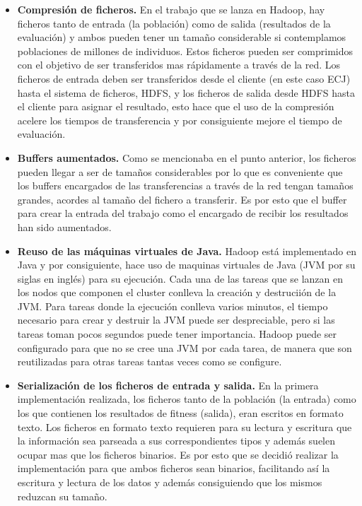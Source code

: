 \begin{itemize}
	\item \textbf{Compresi\'on de ficheros.} En el trabajo que se lanza en Hadoop, hay ficheros tanto de entrada (la población) como de salida (resultados de la evaluación) y ambos pueden tener un tamaño considerable si contemplamos poblaciones de millones de individuos. Estos ficheros pueden ser comprimidos con el objetivo de ser transferidos mas rápidamente a trav\'es de la red. Los ficheros de entrada deben ser transferidos desde el cliente (en este caso ECJ) hasta el sistema de ficheros, HDFS, y los ficheros de salida desde HDFS hasta el cliente para asignar el resultado, esto hace que el uso de la compresión acelere los tiempos de transferencia y por consiguiente mejore el tiempo de evaluación.
	\item \textbf{Buffers aumentados.} Como se mencionaba en el punto anterior, los ficheros pueden llegar a ser de tamaños considerables por lo que es conveniente que los buffers encargados de las transferencias a través de la red tengan tamaños grandes, acordes al tamaño del fichero a transferir. Es por esto que el buffer para crear la entrada del trabajo como el encargado de recibir los resultados han sido aumentados.
	\item \textbf{Reuso de las m\'aquinas virtuales de Java.} Hadoop est\'a implementado en Java y por consiguiente, hace uso de maquinas virtuales de Java (JVM por su siglas en ingl\'es) para su ejecuci\'on. Cada una de las tareas que se lanzan en los nodos que componen el cluster conlleva la creaci\'on y destrucii\'on de la JVM. Para tareas donde la ejecuci\'on conlleva varios minutos, el tiempo necesario para crear y destruir la JVM puede ser despreciable, pero si las tareas toman pocos segundos puede tener importancia. Hadoop puede ser configurado para que no se cree una JVM por cada tarea, de manera que son reutilizadas para otras tareas tantas veces como se configure.
	\item \textbf{Serializaci\'on de los ficheros de entrada y salida.} En la primera implementación realizada, los ficheros tanto de la población (la entrada) como los que contienen los resultados de fitness (salida), eran escritos en formato texto. Los ficheros en formato texto requieren para su lectura y escritura que la información sea parseada a sus correspondientes tipos y adem\'as suelen ocupar mas que los ficheros binarios. Es por esto que se decidió realizar la implementación para que ambos ficheros sean binarios, facilitando así la escritura y lectura de los datos y adem\'as consiguiendo que los mismos reduzcan su tamaño.
\end{itemize}













